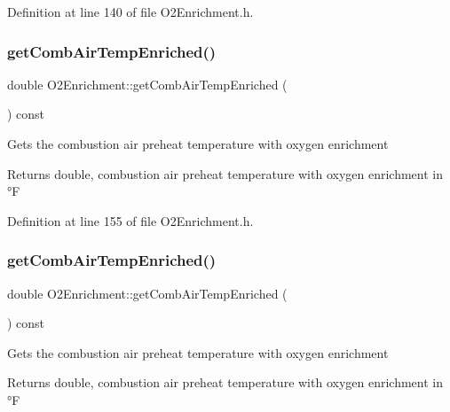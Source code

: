 Definition at line 140 of file O2\+Enrichment.\+h.

\mbox{\label{class_o2_enrichment_ad628ffe961a2733c60e5008fd044eabe}} 
\subsubsection{\texorpdfstring{get\+Comb\+Air\+Temp\+Enriched()}{getCombAirTempEnriched()}\hspace{0.1cm}{\footnotesize\ttfamily [1/3]}}
{\footnotesize\ttfamily double O2\+Enrichment\+::get\+Comb\+Air\+Temp\+Enriched (\begin{DoxyParamCaption}{ }\end{DoxyParamCaption}) const\hspace{0.3cm}{\ttfamily [inline]}}

Gets the combustion air preheat temperature with oxygen enrichment \begin{DoxyReturn}{Returns}
double, combustion air preheat temperature with oxygen enrichment in °F 
\end{DoxyReturn}


Definition at line 155 of file O2\+Enrichment.\+h.

\mbox{\label{class_o2_enrichment_ad628ffe961a2733c60e5008fd044eabe}} 
\subsubsection{\texorpdfstring{get\+Comb\+Air\+Temp\+Enriched()}{getCombAirTempEnriched()}\hspace{0.1cm}{\footnotesize\ttfamily [2/3]}}
{\footnotesize\ttfamily double O2\+Enrichment\+::get\+Comb\+Air\+Temp\+Enriched (\begin{DoxyParamCaption}{ }\end{DoxyParamCaption}) const\hspace{0.3cm}{\ttfamily [inline]}}

Gets the combustion air preheat temperature with oxygen enrichment \begin{DoxyReturn}{Returns}
double, combustion air preheat temperature with oxygen enrichment in °F 
\end{DoxyReturn}


